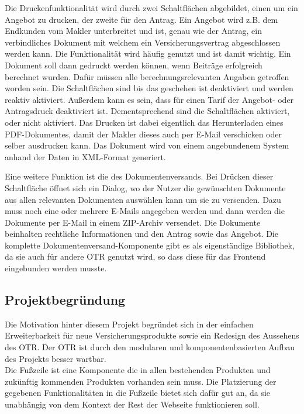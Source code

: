 Die Druckenfunktionalität wird durch zwei Schaltflächen abgebildet, einen um ein Angebot zu drucken, der zweite für den Antrag. Ein Angebot wird z.B. dem Endkunden vom Makler unterbreitet und ist, genau wie der Antrag, ein verbindliches Dokument mit welchem ein Versicherungsvertrag abgeschlossen werden kann. Die Funktionalität wird häufig genutzt und ist damit wichtig. Ein Dokument soll dann gedruckt werden können, wenn Beiträge erfolgreich berechnet wurden. Dafür müssen alle berechnungsrelevanten Angaben getroffen worden sein.
Die Schaltflächen sind bis das geschehen ist deaktiviert und werden reaktiv aktiviert. Außerdem kann es sein, dass für einen Tarif der Angebot- oder Antragsdruck deaktiviert ist. Dementsprechend sind die Schaltflächen aktiviert, oder nicht aktiviert.  Das Drucken ist dabei eigentlich das Herunterladen eines PDF-Dokumentes, damit der Makler dieses auch per E-Mail verschicken oder selber ausdrucken kann. Das Dokument wird von einem angebundenem System anhand der Daten in XML-Format generiert.

Eine weitere Funktion ist die des Dokumentenversands. Bei Drücken dieser Schaltfläche öffnet sich ein Dialog, wo der Nutzer die gewünschten Dokumente aus allen relevanten Dokumenten auswählen kann um sie zu versenden. Dazu muss noch eine oder mehrere E-Mails angegeben werden und dann werden die Dokumente per E-Mail in einem ZIP-Archiv versendet. Die Dokumente beinhalten rechtliche Informationen und den Antrag sowie das Angebot. Die komplette Dokumentenversand-Komponente gibt es als eigenständige Bibliothek, da sie auch für andere \ac{OTR} genutzt wird, so dass diese für das Frontend eingebunden werden musste.

\subsection{Projektbegründung}
\label{projektbegründung}
Die Motivation hinter diesem Projekt begründet sich in der einfachen Erweiterbarkeit für neue Versicherungsprodukte sowie ein Redesign des Aussehens des \ac{OTR}. Der \ac{OTR} ist durch den modularen und komponentenbasierten Aufbau des Projekts besser wartbar. \\
Die Fußzeile ist eine Komponente die in allen bestehenden Produkten und zukünftig kommenden Produkten vorhanden sein muss. Die Platzierung der gegebenen Funktionalitäten in die Fußzeile bietet sich dafür gut an, da sie unabhängig von dem Kontext der Rest der Webseite funktionieren soll.
